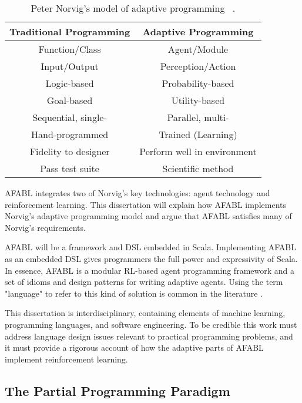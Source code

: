 \begin{table}[h]
\begin{tabular}{|c|c|}\hline
Traditional Programming & Adaptive Programming \\ \hline
Function/Class & Agent/Module \\
Input/Output & Perception/Action \\
Logic-based & Probability-based \\
Goal-based & Utility-based \\
Sequential, single- & Parallel, multi- \\
Hand-programmed & Trained (Learning) \\
Fidelity to designer & Perform well in environment \\
Pass test suite & Scientific method\\ \hline
\end{tabular}
\caption{Peter Norvig's model of adaptive programming
  ~\cite{norvig1998decision}.}
\label{tab:adaptive-model}
\end{table}

AFABL integrates two of Norvig's key technologies: agent technology and reinforcement learning.  This dissertation will explain how AFABL implements Norvig's adaptive programming model and argue that AFABL satisfies many of Norvig's requirements.

AFABL will be a framework and DSL embedded in Scala.  Implementing AFABL as an embedded DSL gives programmers the full power and expressivity of Scala.  In essence, AFABL is a modular RL-based agent programming framework and a set of idioms and design patterns for writing adaptive agents.  Using the term "language" to refer to this kind of solution is common in the literature \cite{andre2002state}.

This dissertation is interdisciplinary, containing elements of machine learning, programming languages, and software engineering.  To be credible this work must address language design issues relevant to practical programming problems, and it must provide a rigorous account of how the adaptive parts of AFABL implement reinforcement learning.

\subsection{The Partial Programming Paradigm}

